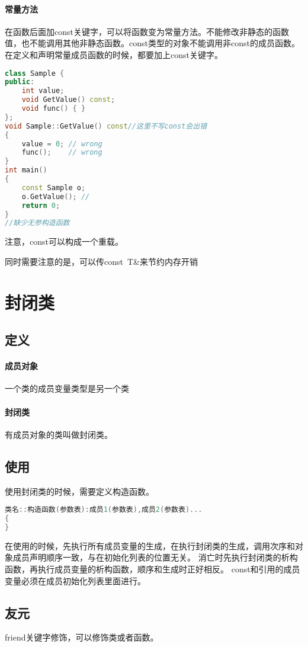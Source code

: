 \documentclass[UTF8]{ctexart}
\begin{document}
\paragraph{常量方法}在函数后面加const关键字，可以将函数变为常量方法。不能修改非静态的函数值，也不能调用其他非静态函数。const类型的对象不能调用非const的成员函数。
在定义和声明常量成员函数的时候，都要加上const关键字。
\begin{lstlisting}[language=C++]
class Sample {
public:
	int value;
	void GetValue() const;
	void func() { }
};
void Sample::GetValue() const//这里不写const会出错
{
	value = 0; // wrong
	func();	   // wrong
}
int main()
{
	const Sample o;
	o.GetValue(); //
	return 0;
}
//缺少无参构造函数
\end{lstlisting}

注意，const可以构成一个重载。

同时需要注意的是，可以传const\ T\&来节约内存开销

\section{封闭类}
\subsection{定义}\paragraph{成员对象}一个类的成员变量类型是另一个类
\paragraph{封闭类}有成员对象的类叫做封闭类。
\subsection{使用}
使用封闭类的时候，需要定义构造函数。
\begin{lstlisting}[language=C++]
类名::构造函数(参数表):成员1(参数表),成员2(参数表)...
{
}
\end{lstlisting}
在使用的时候，先执行所有成员变量的生成，在执行封闭类的生成，调用次序和对象成员声明顺序一致，与在初始化列表的位置无关。
消亡时先执行封闭类的析构函数，再执行成员变量的析构函数，顺序和生成时正好相反。
const和引用的成员变量必须在成员初始化列表里面进行。

\subsection{友元}
friend关键字修饰，可以修饰类或者函数。
\end{document}
